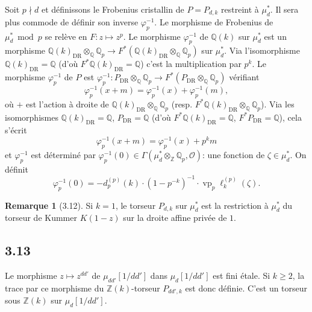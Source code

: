 \documentclass[12pt,a4paper]{article}
\theoremstyle{plain}
\theoremstyle{definition}
\newtheorem{remark}[theorem]{Remarque}
\theoremstyle{remark}
\providecommand{\DR}{\mathrm{DR}}
\begin{document}
Soit $p \nmid d$ et d\'efinissons le Frobenius cristallin de $P = P_{d,k}$ restreint \`a
$\mu_d^*$. Il sera plus commode de d\'efinir son inverse $\varphi_p^{-1}$. Le morphisme de
Frobenius de $\mu_d^* \bmod p$ se rel\`eve en $F: z \mapsto z^p$. Le morphisme
$\varphi_p^{-1}$ de $\mathbb{Q}(k)$ sur $\mu_d^*$ est un morphisme
$\mathbb{Q}(k)_{\DR} \otimes_{\mathbb{Q}} \mathbb{Q}_p \to
F^*(\mathbb{Q}(k)_{\DR} \otimes_{\mathbb{Q}} \mathbb{Q}_p)$ sur $\mu_d^*$.
Via l'isomorphisme $\mathbb{Q}(k)_{\DR} = \mathbb{Q}$ (d'o\`u
$F^*\mathbb{Q}(k)_{\DR} = \mathbb{Q}$) c'est la multiplication par $p^k$. Le morphisme
$\varphi_p^{-1}$ de $P$ est $\varphi_p^{-1}: P_{\DR} \otimes_{\mathbb{Q}} \mathbb{Q}_p \to
F^*(P_{\DR} \otimes_{\mathbb{Q}} \mathbb{Q}_p)$ v\'erifiant
\[
\varphi_p^{-1}(x + m) = \varphi_p^{-1}(x) + \varphi_p^{-1}(m),
\]
o\`u $+$ est l'action \`a droite de $\mathbb{Q}(k)_{\DR} \otimes_{\mathbb{Q}} \mathbb{Q}_p$
(resp. $F^*\mathbb{Q}(k)_{\DR} \otimes_{\mathbb{Q}} \mathbb{Q}_p$). Via les isomorphismes
$\mathbb{Q}(k)_{\DR} = \mathbb{Q}$, $P_{\DR} = \mathbb{Q}$ (d'o\`u
$F^*\mathbb{Q}(k)_{\DR} = \mathbb{Q}$, $F^* P_{\DR} = \mathbb{Q}$), cela s'\'ecrit
\[
\varphi_p^{-1}(x + m) = \varphi_p^{-1}(x) + p^k m
\]
et $\varphi_p^{-1}$ est d\'etermin\'e par $\varphi_p^{-1}(0) \in
\Gamma(\mu_d^* \otimes_{\mathbb{Z}} \mathbb{Q}_p, \mathcal{O})$: une fonction de $\zeta \in
\mu_d^*$. On d\'efinit
\begin{equation}\label{eq:3.11.4}
\varphi_p^{-1}(0) = -d_p^{(p)}(k) \cdot (1 - p^{-k})^{-1} \cdot
\operatorname{vp}_p \ell_k^{(p)}(\zeta).
\end{equation}

\begin{remark}[3.12]\label{rem:3.12}
Si $k = 1$, le torseur $P_{d,k}$ sur $\mu_d^*$ est la restriction \`a $\mu_d^*$ du
torseur de Kummer $K(1-z)$ sur la droite affine priv\'ee de $1$.
\end{remark}

\subsection*{3.13}

Le morphisme $z \mapsto z^{dd'}$ de $\mu_{dd'}[1/dd']$ dans $\mu_d[1/dd']$ est fini
\'etale. Si $k \geq 2$, la trace par ce morphisme du $\mathbb{Z}(k)$-torseur $P_{dd',k}$
est donc d\'efinie. C'est un torseur sous $\mathbb{Z}(k)$ sur $\mu_d[1/dd']$.
\end{document}
